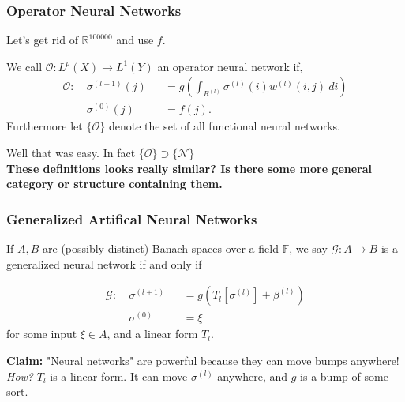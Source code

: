 \documentclass{beamer}
\begin{document}
\begin{frame}
	\frametitle{Operator Neural Networks}
	Let's get rid of $\mathbb{R}^{100000}$ and use $f.$
	\begin{definition}
We call $\mathcal{O}: L^p(X) \to L^1(Y)$ an operator neural network if,
\begin{equation}
          \begin{alignedat}{2}
        \mathcal{O}:\ &\sigma^{(l+1)}(j) & &=  g\left(\int_{R^{(l)}} \sigma^{(l)}(i) w^{(l)}(i,j)\ di \right)  \\
        &\sigma^{(0)}(j) & &= f(j). 
        \end{alignedat}
\end{equation}
Furthermore let $\{\mathcal{O}\}$ denote the set of all functional neural networks.
\end{definition}
Well that was easy. In fact $\{\mathcal{O}\} \supset \{\mathcal{N}\}$ \\
\textbf{These definitions looks really similar? Is there some more general category or structure containing them.}
\end{frame}

\begin{frame}
	\frametitle{Generalized Artifical Neural Networks}
	 

	\begin{definition} If $A,B$ are (possibly distinct) Banach spaces over a field $\mathbb{F}$,
we say $\mathcal{G}: A \to B$ is a generalized neural network if and only if 

\begin{equation} \label{eq:gann}
          \begin{alignedat}{2}
        \mathcal{G}:\ &\sigma^{(l+1)} & &=  g\left(T_l\left[\sigma^{(l)}\right] + \beta^{(l)}\right)  \\
        &\sigma^{(0)} & &= \xi 
        \end{alignedat}
\end{equation}
for some input $\xi \in A$, and a linear form $T_l$.
\end{definition}
	\textbf{Claim:}
	"Neural networks" are powerful because they can move bumps anywhere! \\
	\emph{How?} $T_l$ is a linear form. It can move $\sigma^{(l)}$ anywhere, and $g$ is a bump of some sort.
\end{frame}
\end{document}
